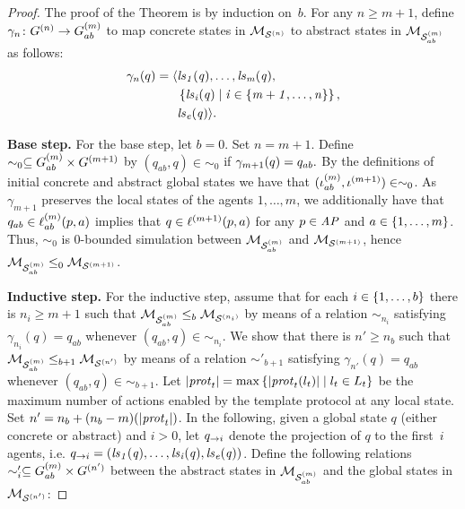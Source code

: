 \documentclass{article}
\begin{document}
\begin{proof}

The proof of the Theorem is by induction on~$b$. For any $n \geq m+1$,  define
$\gamma_n \colon G^{(n)} \rightarrow G^{(m)}_{ab}$ to map concrete
states in $\mathcal{M}_{\mathcal{S}^{(n)}}$ to abstract states in $\mathcal{M}_{\mathcal{S}_{ab}^{(m)}}$ as follows:
\begin{align*}
  \gamma_n(q) =  \langle &\it{ls}_{1}(q), \ldots, \it{ls}_{m}(q), \\
  &\left \{ \it{ls}_{i}(q) \mid i \in \left \{ m + 1, \ldots, n \right \} \right \}, \\
  &\it{ls}_{e}(q)  \rangle.
\end{align*}

{\bf Base step.} For the base step, let $b = 0$. Set $n = m+1$. Define $\sim_0 \subseteq 
    G^{(m)}_{ab} \times G^{(m+1)}$ by $(q_{ab}, q) \in \sim_0$ if 
$\gamma_{m+1}(q) = q_{ab}.$
By the definitions of
    initial concrete and abstract global states we have that $(\iota^{({m})}_{ab},
    \iota^{({m+1})}) \in \sim_0$.  
    As $\gamma_{m+1}$ preserves
the local states of the agents $1, \ldots, m$, we additionally have that $q_{ab} \in
\ell^{(m)}_{ab}(p, a)$ implies that $q \in \ell^{(m+1)}(p, a)$ for any $p \in
\it{AP}$ and $a \in \left \{ 1, \ldots, m \right \}$. Thus,  $\sim_0$ is $0$-bounded
simulation between $\mathcal{M}_{\mathcal{S}_{ab}^{(m)}}$ and $\mathcal{M}_{\mathcal{S}^{(m+1)}}$, hence $\mathcal{M}_{\mathcal{S}_{ab}^{(m)}} \leq_0 \mathcal{M}_{\mathcal{S}^{(m+1)}}$.

{\bf Inductive step.} For the inductive step, assume that for each $i \in
    \left \{ 1, \ldots, b \right \}$ there is $n_i \geq m + 1$ such that $\mathcal{M}_{\mathcal{S}_{ab}^{(m)}} \leq_b
    \mathcal{M}_{\mathcal{S}^{(n_i)}}$ by means of a relation $\sim_{n_i}$ satisfying
    $\gamma_{n_i}(q)=q_{ab}$ whenever $(q_{ab}, q) \in \sim_{n_i}$.
    We show that there is $n' \geq n_b$ such that $\mathcal{M}_{\mathcal{S}_{ab}^{(m)}} \leq_{b+1}
    \mathcal{M}_{\mathcal{S}^{(n')}}$ by means of a relation $\sim'_{b+1}$ satisfying
$\gamma_{n'}(q)=q_{ab}$ whenever  $(q_{ab}, q) \in
    \sim_{b+1}$.
    Let $|\mathit{prot}_{t}| = \max \left \{ |\mathit{prot}_{t}(l_t)| \mid l_t \in L_{t} \right \}$ be the
    maximum number of actions enabled by the template protocol at any local
    state. Set $n' = n_b +  (n_b -m) (|\mathit{prot}_{t}|)$.  In the following,
given a global state $q$ (either concrete or abstract) and $i > 0$, let
$q_{\rightarrow i}$ denote the projection of $q$ to the first~$i$ agents, i.e.
$q_{\rightarrow i} = \left ( \it{ls}_{1}(q), \ldots, \it{ls}_{i}(q),
\it{ls}_{e}(q) \right )$.  Define the following relations
    $\sim'_i \subseteq G^{(m)}_{ab} \times G^{(n')}$ between the
    abstract states in $\mathcal{M}_{\mathcal{S}_{ab}^{(m)}}$ and the global states in
    $\mathcal{M}_{\mathcal{S}^{(n')}}$:


\end{proof}
\end{document}
